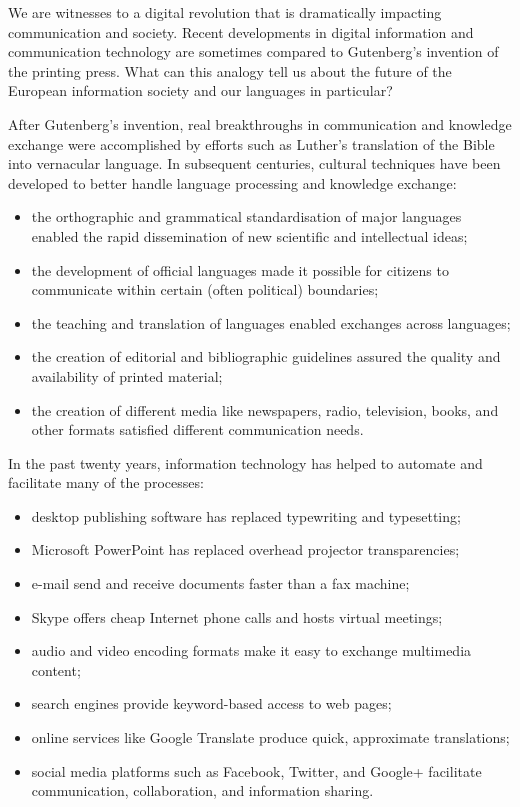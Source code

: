 \clearpage


\begin{multicols}{2}

We are witnesses to a digital revolution that is dramatically impacting communication and society. Recent developments in digital information and communication technology are sometimes compared to Gutenberg’s invention of the printing press. What can this analogy tell us about the future of the European information society and our languages in particular?

After Gutenberg’s invention, real breakthroughs in communication and knowledge exchange were accomplished by efforts such as Luther’s translation of the Bible into vernacular language. In subsequent centuries, cultural techniques have been developed to better handle language processing and knowledge exchange:

\begin{itemize}
\item the orthographic and grammatical standardisation of major languages enabled the rapid dissemination of new scientific and intellectual ideas;
\item the development of official languages made it possible for citizens to communicate within certain (often political) boundaries;
\item the teaching and translation of languages enabled exchanges across languages;
\item the creation of editorial and bibliographic guidelines assured the quality and availability of printed material;
\item the creation of different media like newspapers, radio, television, books, and other formats satisfied different communication needs. 
\end{itemize}

In the past twenty years, information technology has helped to automate and facilitate many of the processes:

\begin{itemize}
\item desktop publishing software has replaced typewriting and typesetting;
\item Microsoft PowerPoint has replaced overhead projector transparencies;
\item e-mail send and receive documents faster than a fax machine;
\item Skype offers cheap Internet phone calls and hosts virtual meetings;
\item audio and video encoding formats make it easy to exchange multimedia content;
\item search engines provide keyword-based access to web pages;
\item online services like Google Translate produce quick, approximate translations;
\item social media platforms such as Facebook, Twitter, and Google+ facilitate communication, collaboration, and information sharing.
\end{itemize}


\end{multicols}
